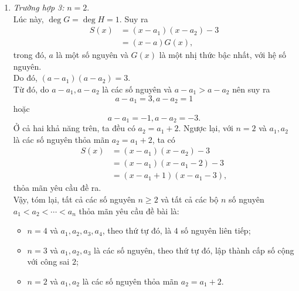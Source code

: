 \begin{bt}
{\begin{enumerate}
			Do đó, $(a-a_1)(a-a_2)(a-a_3)=3$.\\
			Từ đó, do $a-a_1, a-a_2, a-a_3$ là các số nguyên và $a-a_1>a-a_2>a-a_3$ nên suy ra
			$$ a-a_1=1, a-a_2=-1\mbox{ và } a-a_3=-3. $$
			Như vậy, $a_1,a_2,a_3$ là một cấp số cộng với công sai $2$.\\
			Ngược lại, với $n=3$ và $a_1, a_2, a_3$ là các số nguyên, theo thứ tự đó, lập thành cấp số cộng với công sai $2$, ta có
			\begin{align*}
			S(x)&=(x-a_1)(x-a_2)(x-a_3)-3\\
			&=(x-a_1)(x-a_1-2)(x-a_1-4)-3\\
			&=(x-a_1-1)[(x-a_1)^2-5(x-a_1)+3],
			\end{align*}
			thỏa mãn yêu cầu đề ra.
			\item \textit{Trường hợp 3:} $n=2$.\\
			Lúc này, $\deg G=\deg H=1$. Suy ra
			\begin{align*}
			S(x)&=(x-a_1)(x-a_2)-3\\
			&=(x-a)G(x),
			\end{align*}
			trong đó, $a$ là một số nguyên và $G(x)$ là một nhị thức bậc nhất, với hệ số nguyên.\\
			Do đó, $(a-a_1)(a-a_2)=3$.\\
			Từ đó, do $a-a_1, a-a_2$ là các số nguyên và $a-a_1>a-a_2$ nên suy ra
		$$a-a_1=3, a-a_2=1$$
	hoặc
	$$a-a_1=-1, a-a_2=-3.$$
		Ở cả hai khả năng trên, ta đều có $a_2=a_1+2$.
			Ngược lại, với $n=2$ và $a_1, a_2$ là các số nguyên thỏa mãn $a_2=a_1+2$, ta có
			\begin{align*}
			S(x)&=(x-a_1)(x-a_2)-3\\
			&=(x-a_1)(x-a_1-2)-3\\
			&=(x-a_1+1)(x-a_1-3),
			\end{align*}
			thỏa mãn yêu cầu đề ra.\\
			Vậy, tóm lại, tất cả các số nguyên $n\geq 2$ và tất cả các bộ $n$ số nguyên $a_1<a_2<\cdots <a_n$ thỏa mãn yêu cầu đề bài là:
			\begin{itemize}
				\item $n=4$ và $a_1, a_2, a_3, a_4$, theo thứ tự đó, là $4$ số nguyên liên tiếp;
				\item $n=3$ và $a_1, a_2, a_3$ là các số nguyên, theo thứ tự đó, lập thành cấp số cộng với công sai $2$;
				\item $n=2$ và $a_1, a_2$ là các số nguyên thỏa mãn $a_2=a_1+2$.
			\end{itemize}
		\end{enumerate}
	}
\end{bt}

